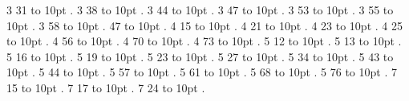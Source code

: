 \smallskip
{} 3 31 \leaders\hbox to 10pt {\hss.\hss}  \hfill {}
\smallskip
{} 3 38 \leaders\hbox to 10pt {\hss.\hss}  \hfill {}
\smallskip
{} 3 44 \leaders\hbox to 10pt {\hss.\hss}  \hfill {}
\smallskip
{} 3 47 \leaders\hbox to 10pt {\hss.\hss}  \hfill {}
\smallskip
{} 3 53 \leaders\hbox to 10pt {\hss.\hss}  \hfill {}
\smallskip
{} 3 55 \leaders\hbox to 10pt {\hss.\hss}  \hfill {}
\smallskip
{} 3 58 \leaders\hbox to 10pt {\hss.\hss}  \hfill {}
\smallskip
{} 47 \leaders\hbox to 10pt {\hss.\hss}  \hfill {}
\smallskip
{} 4 15 \leaders\hbox to 10pt {\hss.\hss}  \hfill {}
\smallskip
{} 4 21 \leaders\hbox to 10pt {\hss.\hss}  \hfill {}
\smallskip
{} 4 23 \leaders\hbox to 10pt {\hss.\hss}  \hfill {}
\smallskip
{} 4 25 \leaders\hbox to 10pt {\hss.\hss}  \hfill {}
\smallskip
{} 4 56 \leaders\hbox to 10pt {\hss.\hss}  \hfill {}
\smallskip
{} 4 70 \leaders\hbox to 10pt {\hss.\hss}  \hfill {}
\smallskip
{} 4 73 \leaders\hbox to 10pt {\hss.\hss}  \hfill {}
\smallskip
{} 5 12 \leaders\hbox to 10pt {\hss.\hss}  \hfill {}
\smallskip
{} 5 13 \leaders\hbox to 10pt {\hss.\hss}  \hfill {}
\smallskip
{} 5 16 \leaders\hbox to 10pt {\hss.\hss}  \hfill {}
\smallskip
{} 5 19 \leaders\hbox to 10pt {\hss.\hss}  \hfill {}
\smallskip
{} 5 23 \leaders\hbox to 10pt {\hss.\hss}  \hfill {}
\smallskip
{} 5 27 \leaders\hbox to 10pt {\hss.\hss}  \hfill {}
\smallskip
{} 5 34 \leaders\hbox to 10pt {\hss.\hss}  \hfill {}
\smallskip
{} 5 43 \leaders\hbox to 10pt {\hss.\hss}  \hfill {}
\smallskip
{} 5 44 \leaders\hbox to 10pt {\hss.\hss}  \hfill {}
\smallskip
{} 5 57 \leaders\hbox to 10pt {\hss.\hss}  \hfill {}
\smallskip
{} 5 61 \leaders\hbox to 10pt {\hss.\hss}  \hfill {}
\smallskip
{} 5 68 \leaders\hbox to 10pt {\hss.\hss}  \hfill {}
\smallskip
{} 5 76 \leaders\hbox to 10pt {\hss.\hss}  \hfill {}
\smallskip
{} 7 15 \leaders\hbox to 10pt {\hss.\hss}  \hfill {}
\smallskip
{} 7 17 \leaders\hbox to 10pt {\hss.\hss}  \hfill {}
\smallskip
{} 7 24 \leaders\hbox to 10pt {\hss.\hss}  \hfill {}
